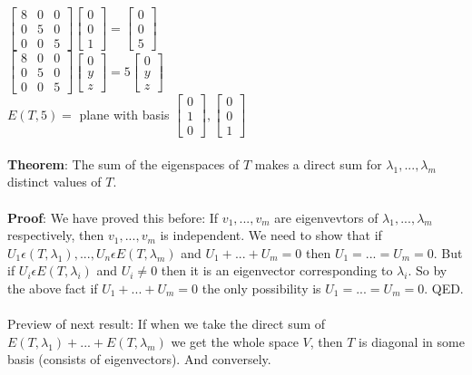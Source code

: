 \documentclass{article}
\begin{document}
$\begin{bmatrix}
    8&0&0\\0&5&0\\0&0&5
\end{bmatrix} \begin{bmatrix}
    0\\0\\1
\end{bmatrix} = \begin{bmatrix}
    0\\0\\5
\end{bmatrix}$\\
$\begin{bmatrix}
    8&0&0\\0&5&0\\0&0&5
\end{bmatrix} \begin{bmatrix}
    0\\y\\z
\end{bmatrix} = 5 \begin{bmatrix}
    0 \\y\\z
\end{bmatrix}$\\
$E(T,5) = $ plane with basis $\begin{bmatrix}
    0\\1\\0
\end{bmatrix}, \begin{bmatrix}
    0\\0\\1
\end{bmatrix}$\\\\
\textbf{Theorem}: The sum of the eigenspaces of $T$ makes a direct sum for $\lambda_1, ..., \lambda_m$ distinct values of $T$. \\\\
\textbf{Proof}: We have proved this before: If $v_1,...,v_m$ are eigenvevtors of $\lambda_1,..., \lambda_m$ respectively, then $v_1,...,v_m$ is independent. We need to show that if $U_1 \epsilon (T, \lambda_1), ..., U_n \epsilon E(T, \lambda_m)$ and $U_1 + ... + U_m = 0$ then $U_1 = ... = U_m = 0$. But if $U_i \epsilon E(T, \lambda_i)$ and $U_i \neq 0$ then it is an eigenvector corresponding to $\lambda_i$. So by the above fact if $U_1 + ... + U_m = 0$ the only possibility is $U_1 = ... = U_m = 0$. QED. \\\\
Preview of next result: If when we take the direct sum of $E(T, \lambda_1) + ... + E(T, \lambda_m)$ we get the whole space $V$, then $T$ is diagonal in some basis (consists of eigenvectors). And conversely. 
\end{document}
